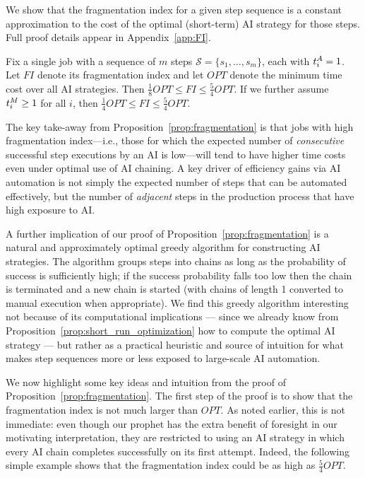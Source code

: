 %
We show that the fragmentation index for a given step sequence is a constant approximation to the cost of the optimal (short-term) AI strategy for those steps.  Full proof details appear in Appendix~\ref{app:FI}.


\begin{proposition}
\label{prop:fragmentation}
   Fix a single job with a sequence of $m$ steps $\mathcal{S} = \{s_1, \dotsc, s_m\}$, each with $t^{A}_{i} = 1$.
   Let $FI$ denote its fragmentation index and let $OPT$ denote the minimum time cost over all AI strategies.
   Then $\tfrac{1}{8}OPT \leq FI \leq \tfrac{5}{4}OPT$.
   If we further assume $t^{M}_{i} \geq 1$ for all $i$, then $\tfrac{1}{4}OPT \leq FI \leq \tfrac{5}{4}OPT$.
\end{proposition}

The key take-away from Proposition~\ref{prop:fragmentation} is that jobs with high fragmentation index---i.e., those for which the expected number of \emph{consecutive} successful step executions by an AI is low---will tend to have higher time costs even under optimal use of AI chaining.  
A key driver of efficiency gains via AI automation is not simply the expected number of steps that can be automated effectively, but the number of \emph{adjacent} steps in the production process that have high exposure to AI.

A further implication of our proof of Proposition~\ref{prop:fragmentation} is a natural and approximately optimal greedy algorithm for constructing AI strategies. The algorithm groups steps into chains as long as the probability of success is sufficiently high; if the success probability falls too low then the chain is terminated and a new chain is started (with chains of length 1 converted to manual execution when appropriate). We find this greedy algorithm interesting not because of its computational implications --- since we already know from Proposition~\ref{prop:short_run_optimization} how to compute the optimal AI strategy --- but rather as a practical heuristic and source of intuition for what makes step sequences more or less exposed to large-scale AI automation.

We now highlight some key ideas and intuition from the proof of  Proposition~\ref{prop:fragmentation}.  The first step of the proof is to show that the fragmentation index is not much larger than $OPT$.  As noted earlier, this is not immediate: even though our prophet has the extra benefit of foresight in our motivating interpretation, they are restricted to using an AI strategy in which every AI chain completes successfully on its first attempt.  Indeed, the following simple example shows that the fragmentation index could be as high as $\tfrac{5}{4}OPT$.

